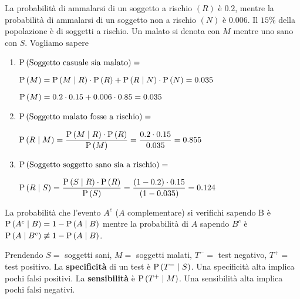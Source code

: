 \begin{exrc}
	La probabilit\`a di ammalarsi di un soggetto a rischio $ (R) $ \`e $ 0.2 $, mentre la probabilit\`a di ammalarsi di un soggetto non a rischio $ (N) $ \`e $ 0.006 $. Il $ 15\% $ della popolazione \`e di soggetti a rischio. Un malato si denota con $ M $ mentre uno sano con $ S $. Vogliamo sapere

	\begin{enumerate}
		\item $ \text{P}\left(\text{Soggetto casuale sia malato}\right) = $
		
		$ \text{P}\left(M\right) = \text{P}\left(M \mid R\right) \cdot \text{P}\left(R\right) + \text{P}\left(R \mid N\right) \cdot \text{P}\left(N\right) = 0.035 $ 
		
		$ \text{P}\left(M\right) = 0.2 \cdot 0.15 + 0.006 \cdot 0.85 = 0.035 $
		
		\item $ \text{P}\left(\text{Soggetto malato fosse a rischio}\right) = $
		
		$ \text{P}\left(R \mid M\right) = \dfrac{\text{P}\left(M \mid R\right) \cdot \text{P}\left(R\right)}{\text{P}\left(M\right)} = \dfrac{0.2 \cdot 0.15}{0.035} = 0.855 $
		
		\item $ \text{P}\left(\text{Soggetto soggetto sano sia a rischio}\right) = $
		
		$ \text{P}\left(R \mid S\right) = \dfrac{\text{P}\left(S \mid R\right) \cdot \text{P}\left(R\right)}{\text{P}\left(S\right)} = \dfrac{(1-0.2) \cdot 0.15}{(1-0.035)} = 0.124$
	\end{enumerate}
	
	\begin{note}
		La probabilit\`a che l'evento $ A^c $ ($ A $ complementare) si verifichi sapendo B \`e $ \text{P}\left(A^c \mid B\right) = 1 - \text{P}\left(A \mid B\right) $ 
		mentre la probabilit\`a di $ A $ sapendo $ B^c $ \`e $ \text{P}\left(A \mid B^c\right) \not\equiv 1 - \text{P}\left(A \mid B\right) $.
	\end{note}

	\begin{defn}
		Prendendo $ S = $ soggetti sani, $ M = $ soggetti malati, $ T^- = $ test negativo, $ T^+ = $ test positivo. 
		La \textbf{specificit\`a} di un test \`e $ \text{P}\left(T^- \mid S\right) $. Una specificit\`a alta implica pochi falsi positivi. 
		La \textbf{sensibilit\`a} \`e $ \text{P}\left(T^+ \mid M\right) $. Una sensibilit\`a alta implica pochi falsi negativi.
	\end{defn}
\end{exrc}


